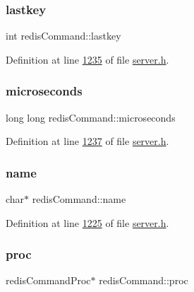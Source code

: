 \subsubsection{\texorpdfstring{lastkey}{lastkey}}
{\footnotesize\ttfamily int redis\+Command\+::lastkey}



Definition at line \hyperlink{server_8h_source_l01235}{1235} of file \hyperlink{server_8h_source}{server.\+h}.

\mbox{\label{structredisCommand_aaea295b9c3b26a4e8133cf0d3b110ccf}} 
\subsubsection{\texorpdfstring{microseconds}{microseconds}}
{\footnotesize\ttfamily long long redis\+Command\+::microseconds}



Definition at line \hyperlink{server_8h_source_l01237}{1237} of file \hyperlink{server_8h_source}{server.\+h}.

\mbox{\label{structredisCommand_ae4526b00fd9f55a6f6a9eab29c536116}} 
\subsubsection{\texorpdfstring{name}{name}}
{\footnotesize\ttfamily char$\ast$ redis\+Command\+::name}



Definition at line \hyperlink{server_8h_source_l01225}{1225} of file \hyperlink{server_8h_source}{server.\+h}.

\mbox{\label{structredisCommand_a24f22d9b254c49ba9fedf8f260ba6ad8}} 
\subsubsection{\texorpdfstring{proc}{proc}}
{\footnotesize\ttfamily redis\+Command\+Proc$\ast$ redis\+Command\+::proc}



